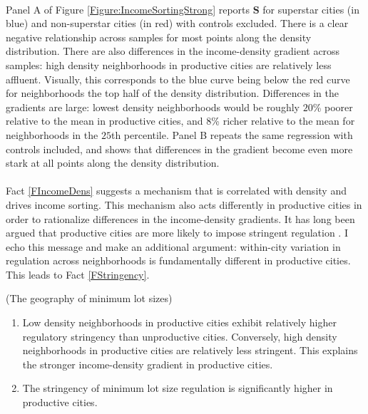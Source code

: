 \documentclass[12pt]{article}
\begin{document}
	\paragraph*{}
	Panel A of Figure \ref{Figure:IncomeSortingStrong} reports $\mathbf{S}$ for superstar cities (in blue) and non-superstar cities (in red) with controls excluded. There is a clear negative relationship across samples for most points along the density distribution. There are also differences in the income-density gradient across samples: high density neighborhoods in productive cities are relatively less affluent. Visually, this corresponds to the blue curve being below the red curve for neighborhoods the top half of the density distribution. Differences in the gradients are large: lowest density neighborhoods would be roughly $20$\% poorer relative to the mean in productive cities, and $8$\% richer relative to the mean for neighborhoods in the $25$th percentile. Panel B repeats the same regression with controls included, and shows that differences in the gradient become even more stark at all points along the density distribution.

	\paragraph*{} 
	Fact \ref{FIncomeDens} suggests a mechanism that is correlated with density and drives income sorting. This mechanism also acts differently in productive cities in order to rationalize differences in the income-density gradients. It has long been argued that productive cities are more likely to impose stringent regulation \citep{HILBER2013,parkho, durantonpugaurbgrowth}. I echo this message and make an additional argument: within-city variation in regulation across neighborhoods is fundamentally different in productive cities. This leads to Fact \ref{FStringency}. 

	\begin{Fact}\label{FStringency}
		(The geography of minimum lot sizes)
		\begin{enumerate}
			\item  Low density neighborhoods in productive cities exhibit relatively higher regulatory stringency than unproductive cities. Conversely, high density neighborhoods in productive cities are relatively less stringent. This explains the stronger income-density gradient in productive cities. 		
			\item  The stringency of minimum lot size regulation is significantly higher in productive cities. 
		\end{enumerate}
	\end{Fact}
	
\end{document}
